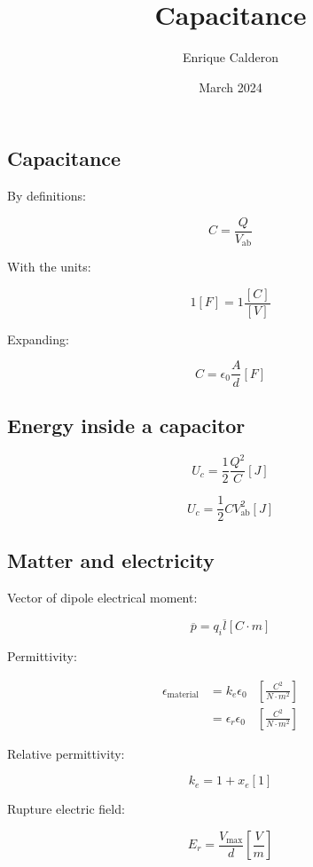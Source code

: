\documentclass[letterpaper]{article}
\title{Capacitance}
\author{Enrique Calderon}
\date{March 2024}
\newcommand{\divline}{\noindent\makebox[\linewidth]{\rule{\textwidth}{0.4pt}}}
\begin{document}
    \maketitle

    \divline
    \begin{multicols}{3}
        \section{Capacitance}

        By definitions:

        \[C = \frac{Q}{V_{\text{ab}}}\]

        With the units:

        \[ 1[F] = 1\frac{[C]}{[V]}\]

        Expanding:

        \[C = \epsilon_{0} \frac{A}{d} [F]\]
    \end{multicols}

    \divline
    \begin{multicols}{2}
        \section{Energy inside a capacitor}
        
        \[U_{c} = \frac{1}{2} \frac{Q^{2}}{C} [J]\]

        \[U_{c} = \frac{1}{2} C V^{2}_{\text{ab}} [J]\]
        
    \end{multicols}

    \divline
    \begin{multicols}{3}
        \section{Matter and electricity}

        Vector of dipole electrical moment:

        \[\overline{p}  = q_{i} \overline{l} [C \cdot m]\]

        Permittivity:

        \begin{align*}
            \epsilon_{\text{material}} &= k_{e} \epsilon_{0} &\left[ \frac{C^{2}}{N \cdot m^{2}} \right] \\
                &= \epsilon_{r} \epsilon_{0} &\left[ \frac{C^{2}}{N \cdot m^{2}} \right]
        \end{align*}

        Relative permittivity:

        \[k_{e} = 1 + x_{e} [1]\]

        Rupture electric field:

        \[E_{r} = \frac{V_{\text{max}}}{d} \left[ \frac{V}{m} \right]\]
    \end{multicols}
\end{document}
